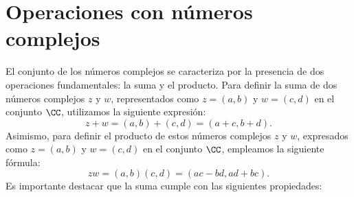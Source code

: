 \section{Operaciones con números complejos}

El conjunto de los números complejos se caracteriza por la presencia de dos operaciones fundamentales: la suma y el producto. Para definir la suma de dos números complejos $z$ y $w$, representados como $z = (a, b)$ y $w = (c, d)$ en el conjunto $\CC$, utilizamos la siguiente expresión:
$$z + w = (a, b) + (c, d) = (a + c, b + d).$$
Asimismo, para definir el producto de estos números complejos $z$ y $w$, expresados como $z = (a, b)$ y $w = (c, d)$ en el conjunto $\CC$, empleamos la siguiente fórmula:
$$zw = (a, b)(c, d) = (ac - bd, ad + bc).$$
Es importante destacar que la suma cumple con las siguientes propiedades:\newpage
